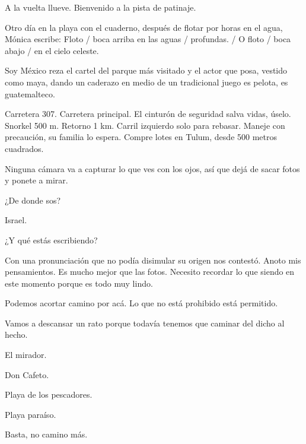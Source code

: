 \documentclass[11pt,twoside,openright,a6paper]{book}
\begin{document}
\vspace{1.5cm}
A la vuelta llueve. Bienvenido a la pista de patinaje.


\vspace{1.5cm}
Otro día en la playa con el cuaderno, después de flotar por horas en el agua, Mónica escribe: Floto / boca arriba en las aguas / profundas. / O floto / boca abajo / en el cielo celeste.


\vspace{1.5cm}
Soy México reza el cartel del parque más visitado y el actor que posa, vestido como maya, dando un caderazo en medio de un tradicional juego es pelota, es guatemalteco.


\vspace{1.5cm}
Carretera 307. Carretera principal. El cinturón de seguridad salva vidas, úselo. Snorkel 500  m. Retorno 1 km. Carril izquierdo solo para rebasar. Maneje con precaución, su familia lo espera. Compre lotes en Tulum, desde 500 metros cuadrados.


\vspace{1.5cm}
Ninguna cámara va a capturar lo que ves con los ojos, así que dejá de sacar fotos y ponete a mirar.


\vspace{1.5cm}
¿De donde sos?

Israel.

¿Y qué estás escribiendo?

Con una pronunciación que no podía disimular su origen nos contestó. Anoto mis pensamientos. Es mucho mejor que las fotos. Necesito recordar lo que siendo en este momento porque es todo muy lindo.


\vspace{1.5cm}
Podemos acortar camino por acá. Lo que no está prohibido está permitido.


\vspace{1.5cm}
Vamos a descansar un rato porque todavía tenemos que caminar del dicho al hecho.


\vspace{1.5cm}
El mirador.

Don Cafeto.

Playa de los pescadores.

Playa paraíso.

Basta, no camino más.
\end{document}
